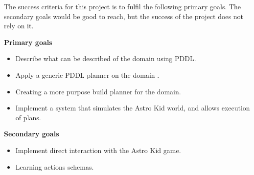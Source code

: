 The success criteria for this project is to fulfil the following primary goals. The secondary goals would be good to reach, but the success of the project does not rely on it.

\textbf{Primary goals}
\begin{itemize}
	\item Describe what can be described of the domain using PDDL.
	\item Apply a generic PDDL planner on the domain .
	\item Creating a more purpose build planner for the domain.
	\item Implement a system that simulates the Astro Kid world, and allows execution of plans.
\end{itemize}

\textbf{Secondary goals}
\begin{itemize}
	\item Implement direct interaction with the Astro Kid game.
	\item Learning actions schemas.
\end{itemize}